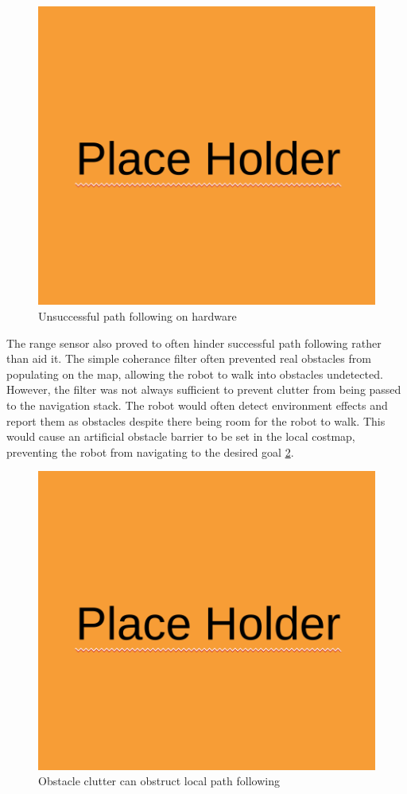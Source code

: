 \begin{figure}[H]
    \centerline{\includegraphics[scale=0.25]{place_holder.png}}
    \caption{Unsuccessful path following on hardware}
    \label{fig:hardware_path_following}
\end{figure}

The range sensor also proved to often hinder successful path following rather than aid it. The simple coherance filter often prevented real obstacles from populating on the map, allowing the robot to walk into obstacles undetected. However, the filter was not always sufficient to prevent clutter from being passed to the navigation stack. The robot would often detect environment effects and report them as obstacles despite there being room for the robot to walk. This would cause an artificial obstacle barrier to be set in the local costmap, preventing the robot from navigating to the desired goal \ref{fig:clutter_barrier}. 

\begin{figure}[H]
    \centerline{\includegraphics[scale=0.25]{place_holder.png}}
    \caption{Obstacle clutter can obstruct local path following}
    \label{fig:clutter_barrier}
\end{figure}

